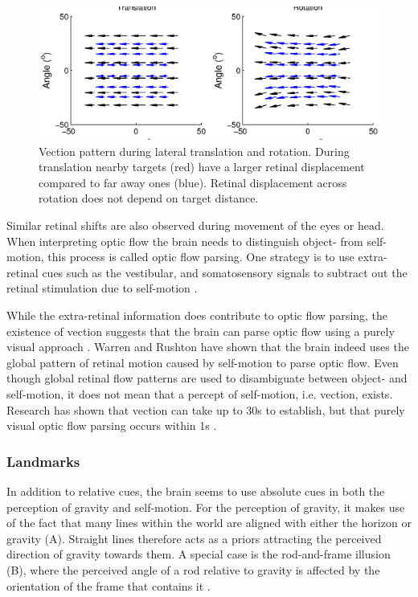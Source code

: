 \begin{figure}
    \includegraphics[width=1.0\textwidth]{src/intro/figures/optic_flow.eps}

    \caption{Vection pattern during  lateral translation and  rotation. During translation nearby targets (red) have a larger retinal displacement compared to far away ones (blue). Retinal displacement across rotation does not depend on target distance. }
    \label{intro:fig:vection}
\end{figure}

Similar retinal shifts are also observed during movement of the eyes or head. When interpreting optic flow the brain needs to distinguish object- from self-motion, this process is called optic flow parsing. One strategy is to use extra-retinal cues such as the vestibular, and somatosensory signals to subtract out the retinal stimulation due to self-motion \cite{wertheim1994,wexler2001,macneilage2012}.

While the extra-retinal information does contribute to optic flow parsing, the existence of vection \cite{dichgans1978} suggests that the brain can parse optic flow using a purely visual approach \cite{rushton2005,warren2007}. Warren and Rushton \citeyear{warren2009} have shown that the brain indeed uses the global pattern of retinal motion caused by self-motion to parse optic flow. Even though global retinal flow patterns are used to disambiguate between object- and self-motion, it does not mean that a percept of self-motion, i.e. vection, exists. Research has shown that vection can take up to 30s to establish, but that purely visual optic flow parsing occurs within 1s \cite{warren2009}.

\subsubsection{Landmarks}
In addition to relative cues, the brain seems to use absolute cues in both the perception of gravity and self-motion. For the perception of gravity, it makes use of the fact that many lines within the world are aligned with either the horizon or gravity (A). Straight lines therefore acts as a priors attracting the perceived direction of gravity towards them. A special case is the rod-and-frame illusion (B), where the perceived angle of a rod relative to gravity is affected by the orientation of the frame that contains it \cite{witkin1948}. 

